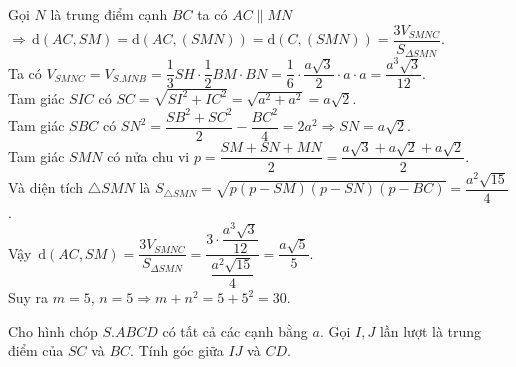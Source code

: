 \begin{bt}
{		Gọi $N$ là trung điểm cạnh $BC$ ta có $AC \parallel MN$ \\
		$ \Rightarrow \mathrm{\,d}(AC,SM)=\mathrm{d}(AC,(SMN))=\mathrm{d}(C,(SMN))=\dfrac{3V_{SMNC}}{S_{\Delta SMN}}$. \\
		Ta có $V_{SMNC}=V_{S.MNB}=\dfrac{1}{3}SH\cdot\dfrac{1}{2}BM\cdot BN=\dfrac{1}{6}\cdot\dfrac{a\sqrt{3}}{2}\cdot a\cdot a=\dfrac{a^3\sqrt{3}}{12}$. \\
		Tam giác $SIC$ có $SC=\sqrt{SI^2+IC^2}=\sqrt{a^2+a^2}=a\sqrt{2}$. \\
		Tam giác $SBC$ có $SN^2=\dfrac{SB^2+SC^2}{2}-\dfrac{BC^2}{4}=2a^2 \Rightarrow SN=a\sqrt{2}$. \\
		Tam giác $SMN$ có nửa chu vi $p=\dfrac{SM+SN+MN}{2}=\dfrac{a\sqrt{3}+a\sqrt{2}+a\sqrt{2}}{2}$. \\
		Và diện tích $\triangle SMN$ là $S_{\triangle SMN}=\sqrt{p(p-SM)(p-SN)(p-BC)}=\dfrac{a^2\sqrt{15}}{4}$. \\
		Vậy $\mathrm{\,d}(AC,SM)=\dfrac{3V_{SMNC}}{S_{\Delta SMN}}=\dfrac{3\cdot \dfrac{a^3\sqrt{3}}{12}}{\dfrac{a^2\sqrt{15}}{4}}=\dfrac{a\sqrt{5}}{5}$.\\
		Suy ra $m=5$, $n=5\Rightarrow m+n^2=5+5^2=30$.
		}
\end{bt}

\begin{bt}%
	Cho hình chóp $S.ABCD$ có tất cả các cạnh bằng $a$. Gọi $I,J$ lần lượt là trung điểm của $SC$ và $BC$. Tính góc giữa $IJ$ và $CD$.
\end{bt}


